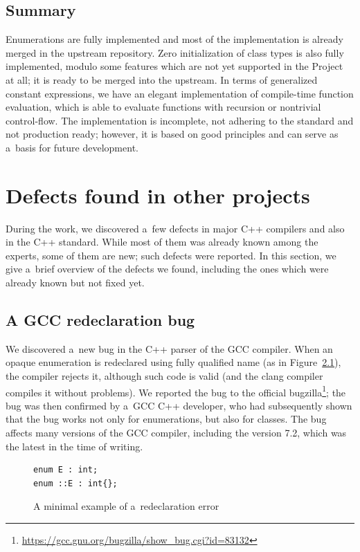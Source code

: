 \documentclass[nolot,nolof,nocover,printed]{fithesis3}
\begin{document}

\section{Summary}

Enumerations are fully implemented and most of the implementation is already merged in the upstream repository. Zero initialization of class types is also fully implemented, modulo some features which are not yet supported in the Project at all; it is ready to be merged into the upstream. In terms of generalized constant expressions, we have an elegant implementation of compile-time function evaluation, which is able to evaluate functions with recursion or nontrivial control-flow. The implementation is incomplete, not adhering to the standard and not production ready; however, it is based on good principles and can serve as a~basis for future development.

\chapter{Defects found in other projects}\label{chap:defects}
During the work, we discovered a~few defects in major C++ compilers and also in the C++ standard. While most of them was already known among the experts, some of them are new; such defects were reported.
In this section, we give a~brief overview of the defects we found, including the ones which were already known but not fixed yet.

\section{A GCC redeclaration bug}
We discovered a~new bug in the C++ parser of the GCC compiler. When an opaque enumeration is redeclared using fully qualified name (as in Figure~\ref{fig:gccRedeclarationBug}), the compiler rejects it, although such code is valid (and the clang compiler compiles it without problems).
We reported the bug to the official bugzilla\footnote{\url{https://gcc.gnu.org/bugzilla/show_bug.cgi?id=83132}}; the bug was then confirmed by a~GCC C++ developer, who had subsequently shown that the bug works not only for enumerations, but also for classes. The bug affects many versions of the GCC compiler, including the version 7.2, which was the latest in the time of writing.

\begin{figure}[ht]
\begin{lstlisting}
enum E : int;
enum ::E : int{};
\end{lstlisting}
\caption{A minimal example of a~redeclaration error}
\label{fig:gccRedeclarationBug}
\end{figure}
\end{document}
